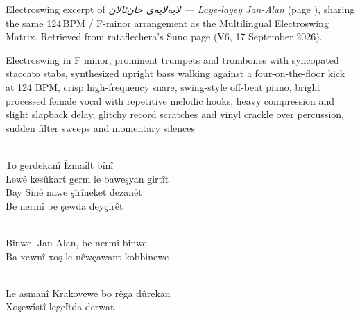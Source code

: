 
\begin{notes}
Electroswing excerpt of \emph{\textarabic{لایە‌لایەی جان‌ئالان} — Laye-layey Jan-Alan} (page \pageref{sec:laye-layey-jan-alan}), sharing the same 124\,BPM / F-minor arrangement as the Multilingual Electroswing Matrix. Retrieved from rataflechera's Suno page (V6, 17 September 2026).
\end{notes}
\begin{style}
Electroswing in F minor, prominent trumpets and trombones with syncopated staccato stabs, synthesized upright bass walking against a four-on-the-floor kick at 124 BPM, crisp high-frequency snare, swing-style off-beat piano, bright processed female vocal with repetitive melodic hooks, heavy compression and slight slapback delay, glitchy record scratches and vinyl crackle over percussion, sudden filter sweeps and momentary silences
\end{style}
\begin{lyrics}
\\
To gerdekanî Îzmaîlt bînî
\\
Lewê kesûkart germ le baweşyan girtît
\\
Bay Sinê nawe şîrînekeť dezanêt\\
Be nermî be şewda deyçirêt

\\
Binwe, Jan-Alan, be nermî binwe\\
Ba xewnî xoş le nêwçawant kobbinewe

\\
Le asmanî Krakovewe bo rêga dûrekan\\
Xoşewîstî legeľtda derwat
\end{lyrics}

